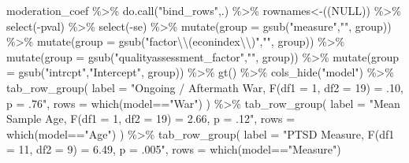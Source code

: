 \documentclass[
  letterpaper,
  DIV=11,
  numbers=noendperiod]{scrartcl}
\newenvironment{Shaded}{\begin{snugshade}}{\end{snugshade}}
\newcommand{\AttributeTok}[1]{\textcolor[rgb]{0.40,0.45,0.13}{#1}}
\newcommand{\ConstantTok}[1]{\textcolor[rgb]{0.56,0.35,0.01}{#1}}
\newcommand{\FunctionTok}[1]{\textcolor[rgb]{0.28,0.35,0.67}{#1}}
\newcommand{\NormalTok}[1]{\textcolor[rgb]{0.00,0.23,0.31}{#1}}
\newcommand{\SpecialCharTok}[1]{\textcolor[rgb]{0.37,0.37,0.37}{#1}}
\newcommand{\StringTok}[1]{\textcolor[rgb]{0.13,0.47,0.30}{#1}}
\begin{document}
\begin{Shaded}
\begin{Highlighting}[]
\NormalTok{moderation\_coef }\SpecialCharTok{\%\textgreater{}\%}
  \FunctionTok{do.call}\NormalTok{(}\StringTok{"bind\_rows"}\NormalTok{,.) }\SpecialCharTok{\%\textgreater{}\%}
  \StringTok{\textasciigrave{}}\AttributeTok{rownames\textless{}{-}}\StringTok{\textasciigrave{}}\NormalTok{((}\ConstantTok{NULL}\NormalTok{)) }\SpecialCharTok{\%\textgreater{}\%}
  \FunctionTok{select}\NormalTok{(}\SpecialCharTok{{-}}\NormalTok{pval) }\SpecialCharTok{\%\textgreater{}\%}
  \FunctionTok{select}\NormalTok{(}\SpecialCharTok{{-}}\NormalTok{se) }\SpecialCharTok{\%\textgreater{}\%}
  \FunctionTok{mutate}\NormalTok{(}\AttributeTok{group =} \FunctionTok{gsub}\NormalTok{(}\StringTok{"measure"}\NormalTok{,}\StringTok{""}\NormalTok{, group)) }\SpecialCharTok{\%\textgreater{}\%}
  \FunctionTok{mutate}\NormalTok{(}\AttributeTok{group =} \FunctionTok{gsub}\NormalTok{(}\StringTok{"factor}\SpecialCharTok{\textbackslash{}\textbackslash{}}\StringTok{(econindex}\SpecialCharTok{\textbackslash{}\textbackslash{}}\StringTok{)"}\NormalTok{,}\StringTok{""}\NormalTok{, group)) }\SpecialCharTok{\%\textgreater{}\%}
  \FunctionTok{mutate}\NormalTok{(}\AttributeTok{group =} \FunctionTok{gsub}\NormalTok{(}\StringTok{"qualityassessment\_factor"}\NormalTok{,}\StringTok{""}\NormalTok{, group)) }\SpecialCharTok{\%\textgreater{}\%}
  \FunctionTok{mutate}\NormalTok{(}\AttributeTok{group =} \FunctionTok{gsub}\NormalTok{(}\StringTok{"intrcpt"}\NormalTok{,}\StringTok{"Intercept"}\NormalTok{, group)) }\SpecialCharTok{\%\textgreater{}\%}
  \FunctionTok{gt}\NormalTok{() }\SpecialCharTok{\%\textgreater{}\%}
  \FunctionTok{cols\_hide}\NormalTok{(}\StringTok{"model"}\NormalTok{) }\SpecialCharTok{\%\textgreater{}\%}
  \FunctionTok{tab\_row\_group}\NormalTok{(}
    \AttributeTok{label =} \StringTok{"Ongoing / Aftermath War, F(df1 = 1, df2 = 19) = .10, p = .76"}\NormalTok{,}
    \AttributeTok{rows =} \FunctionTok{which}\NormalTok{(model}\SpecialCharTok{==}\StringTok{"War"}\NormalTok{)}
\NormalTok{  ) }\SpecialCharTok{\%\textgreater{}\%}
    \FunctionTok{tab\_row\_group}\NormalTok{(}
    \AttributeTok{label =} \StringTok{"Mean Sample Age, F(df1 = 1, df2 = 19) = 2.66, p = .12"}\NormalTok{,}
    \AttributeTok{rows =} \FunctionTok{which}\NormalTok{(model}\SpecialCharTok{==}\StringTok{"Age"}\NormalTok{)}
\NormalTok{  ) }\SpecialCharTok{\%\textgreater{}\%}
    \FunctionTok{tab\_row\_group}\NormalTok{(}
    \AttributeTok{label =} \StringTok{"PTSD Measure, F(df1 = 11, df2 = 9) = 6.49, p = .005"}\NormalTok{,}
    \AttributeTok{rows =} \FunctionTok{which}\NormalTok{(model}\SpecialCharTok{==}\StringTok{"Measure"}\NormalTok{)}

\end{Highlighting}
\end{Shaded}
\end{document}

